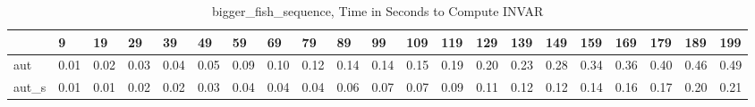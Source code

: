 \begin{table}
\caption{bigger_fish_sequence, Time in Seconds to Compute INVAR}
\label{bigger_fish_sequence_INVAR_time}
\begin{tabular}{lllllllllllllllllllll}
\toprule
 & 9 & 19 & 29 & 39 & 49 & 59 & 69 & 79 & 89 & 99 & 109 & 119 & 129 & 139 & 149 & 159 & 169 & 179 & 189 & 199 \\
\midrule
aut & 0.01 & 0.02 & 0.03 & 0.04 & 0.05 & 0.09 & 0.10 & 0.12 & 0.14 & 0.14 & 0.15 & 0.19 & 0.20 & 0.23 & 0.28 & 0.34 & 0.36 & 0.40 & 0.46 & 0.49 \\
aut_s & 0.01 & 0.01 & 0.02 & 0.02 & 0.03 & 0.04 & 0.04 & 0.04 & 0.06 & 0.07 & 0.07 & 0.09 & 0.11 & 0.12 & 0.12 & 0.14 & 0.16 & 0.17 & 0.20 & 0.21 \\
\bottomrule
\end{tabular}
\end{table}

